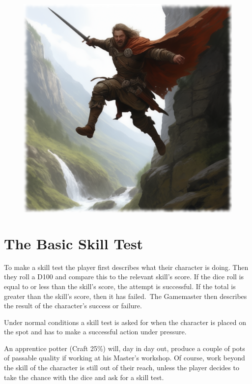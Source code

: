 \begin{figure}[h]
\begin{center}
\includegraphics[scale=0.24]{img/ai-images/warrior-jumping.png}
\end{center}
\end{figure}

\section{The Basic Skill Test}
To make a skill test the player first describes what their character is doing. Then they roll a D100 and compare this to the relevant skill’s score. If the dice roll is equal to or less than the skill’s score, the attempt is successful. If the total is greater than the skill’s score, then it has failed. The Gamemaster then describes the result of the character’s success or failure.

Under normal conditions a skill test is asked for when the character is placed on the spot and has to make a successful action under pressure. 

\begin{rpg-examplebox}
An apprentice potter (Craft 25\%) will, day in day out, produce a couple of pots of passable quality if working at his Master’s workshop. Of course, work beyond the skill of the character is still out of their reach, unless the player decides to take the chance with the dice and ask for a skill test.
\end{rpg-examplebox}

